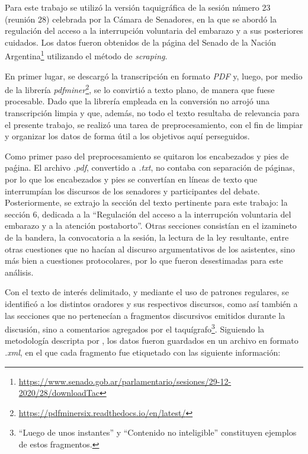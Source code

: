 Para este trabajo se utilizó la versión {taquigr\'afica} de la sesión número
23 (reunión 28) celebrada por la {C\'amara} de Senadores, en la que se abordó la
regulación del acceso a la interrupción voluntaria del embarazo y a sus
posteriores cuidados. Los datos fueron obtenidos de la {p\'agina} del Senado de la Nación
Argentina\footnote{\url{https://www.senado.gob.ar/parlamentario/sesiones/29-12-2020/28/downloadTac}}
utilizando el método de \textit{scraping}.\par
En primer lugar, se descargó la transcripción en formato \textit{PDF} y, luego, por
medio de la librería \textit{pdfminer}\footnote{\url{https://pdfminersix.readthedocs.io/en/latest/}},
se lo convirtió a texto plano, de manera que fuese procesable. Dado que la librería
empleada en la conversión no arrojó una transcripción limpia y que, {adem\'as}, no todo el texto
resultaba de relevancia para el presente trabajo, se {realiz\'o} una tarea de
preprocesamiento, con el fin de limpiar y organizar los datos de forma útil a los
objetivos aquí perseguidos.\par
Como primer paso del preprocesamiento se quitaron los encabezados y pies de paǵina.
El archivo \textit{.pdf}, convertido a \textit{.txt}, no contaba con separación de
{p\'aginas}, por lo que los encabezados y pies se convertían en líneas de texto que
interrumpían los discursos de los senadores y participantes del debate.
Posteriormente, se extrajo la sección del texto pertinente para este trabajo:
la sección 6, dedicada a la ``Regulación  del  acceso  a  la  interrupción
voluntaria  del  embarazo  y  a  la atención postaborto''. Otras secciones consistían
en el izamineto de la bandera, la convocatoria a la sesión, la lectura de la ley
resultante, entre otras cuestiones que no hacían al discurso argumentativos de los
asistentes, sino {m\'as} bien a cuestiones protocolares, por lo que fueron desestimadas
para este {an\'alisis}.\par
Con el texto de interés delimitado, y mediante el uso de patrones regulares, se
identificó a los distintos oradores y sus respectivos discursos, como así también
a las secciones que no pertenecían a fragmentos discursivos emitidos durante la
discusión, sino a comentarios agregados por el taquígrafo\footnote{``Luego de unos
instantes'' y ``Contenido no inteligible'' constituyen ejemplos de estos
fragmentos.}. Siguiendo la metodología descripta por \cite{monroe2008fightin},
los datos fueron guardados en un archivo en formato \textit{.xml}, en el que
cada fragmento fue etiquetado con las siguiente información:
